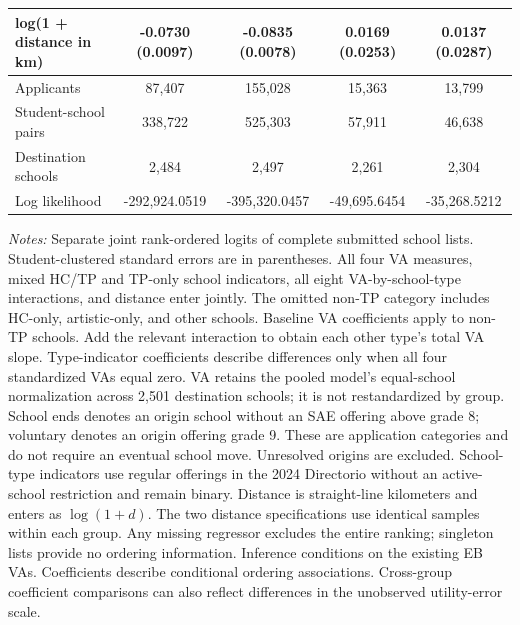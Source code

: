 \begin{table}[!htbp]
{\begin{tabular}{lcccc}
log(1 + distance in km) & -0.0730 (0.0097) & -0.0835 (0.0078) & 0.0169 (0.0253) & 0.0137 (0.0287) \\
\midrule
Applicants & 87,407 & 155,028 & 15,363 & 13,799 \\
Student-school pairs & 338,722 & 525,303 & 57,911 & 46,638 \\
Destination schools & 2,484 & 2,497 & 2,261 & 2,304 \\
Log likelihood & -292,924.0519 & -395,320.0457 & -49,695.6454 & -35,268.5212 \\
\bottomrule
\end{tabular}
}
\par\smallskip
\begin{minipage}{0.98\linewidth}\footnotesize
\textit{Notes:} Separate joint rank-ordered logits of complete submitted school lists. Student-clustered standard errors are in parentheses. All four VA measures, mixed HC/TP and TP-only school indicators, all eight VA-by-school-type interactions, and distance enter jointly. The omitted non-TP category includes HC-only, artistic-only, and other schools. Baseline VA coefficients apply to non-TP schools. Add the relevant interaction to obtain each other type's total VA slope. Type-indicator coefficients describe differences only when all four standardized VAs equal zero. VA retains the pooled model's equal-school normalization across 2,501 destination schools; it is not restandardized by group. School ends denotes an origin school without an SAE offering above grade 8; voluntary denotes an origin offering grade 9. These are application categories and do not require an eventual school move. Unresolved origins are excluded. School-type indicators use regular offerings in the 2024 Directorio without an active-school restriction and remain binary. Distance is straight-line kilometers and enters as $\log(1+d)$. The two distance specifications use identical samples within each group. Any missing regressor excludes the entire ranking; singleton lists provide no ordering information. Inference conditions on the existing EB VAs. Coefficients describe conditional ordering associations. Cross-group coefficient comparisons can also reflect differences in the unobserved utility-error scale.
\end{minipage}
\end{table}
